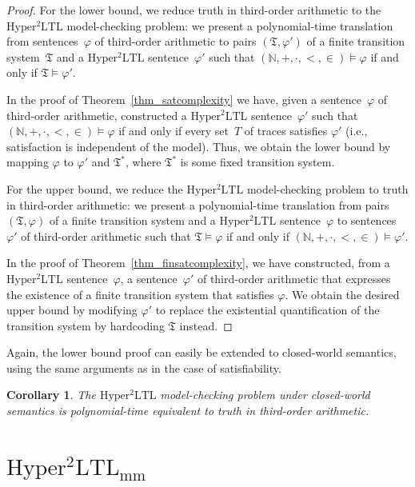 \documentclass[dvipsnames,10pt,a4paper]{amsart}
\newtheorem{cor}[thm]{Corollary}
\theoremstyle{definition}
\theoremstyle{remark}
\newcommand{\nats}{\mathbb{N}}
\renewcommand{\phi}{\varphi}
\newcommand{\sohyltl}{\mathrm{Hyper^2LTL}\xspace}
\newcommand{\sohyltlfp}{\mathrm{Hyper^2LTL_{\mathrm{mm}}}\xspace}
\newcommand{\tsys}{\mathfrak{T}}
\newcommand{\natsstruct}{(\nats, +, \cdot, <, \in)}
\begin{document}
\begin{proof}
For the lower bound, we reduce truth in third-order arithmetic to the $\sohyltl$ model-checking problem: we present a polynomial-time translation from sentences~$\phi$ of third-order arithmetic to pairs $(\tsys, \phi')$ of a finite transition system~$\tsys$ and a $\sohyltl$ sentence~$\phi'$ such that $\natsstruct \models \phi$ if and only if $\tsys \models \phi'$.

In the proof of Theorem~\ref{thm_satcomplexity} we have, given a sentence~$\phi$ of third-order arithmetic, constructed a $\sohyltl$ sentence~$\phi'$ such that $\natsstruct\models \phi$ if and only if every set~$T$ of traces satisfies $\phi'$ (i.e., satisfaction is independent of the model). 
Thus, we obtain the lower bound by mapping $\phi$ to $\phi'$ and $\tsys^*$, where $\tsys^*$ is some fixed transition system.

For the upper bound, we reduce the $\sohyltl$ model-checking problem to truth in third-order arithmetic: we present a polynomial-time translation from pairs~$(\tsys, \phi)$ of a finite transition system and a $\sohyltl$ sentence~$\phi$ to sentences~$\phi'$ of third-order arithmetic such that $\tsys \models \phi$ if and only if $\natsstruct \models \phi'$.

In the proof of Theorem~\ref{thm_finsatcomplexity}, we have constructed, from a $\sohyltl$ sentence~$\phi$, a sentence~$\phi'$ of third-order arithmetic that expresses the existence of a finite transition system that satisfies $\phi$. 
We obtain the desired upper bound by modifying $\phi'$ to replace the existential quantification of the transition system by hardcoding $\tsys$ instead.
\end{proof}



Again, the lower bound proof can easily be extended to closed-world semantics, using the same arguments as in the case of satisfiability.

\begin{cor}
\label{cor_mccomplexity}
The $\sohyltl$ model-checking problem under closed-world semantics is polynomial-time equivalent to truth in third-order arithmetic.
\end{cor}


\section{\texorpdfstring{$\sohyltlfp$}{Second-order HyperLTL with Minimality/Maximality Constraints}} 
\label{sec_mm}
\end{document}
